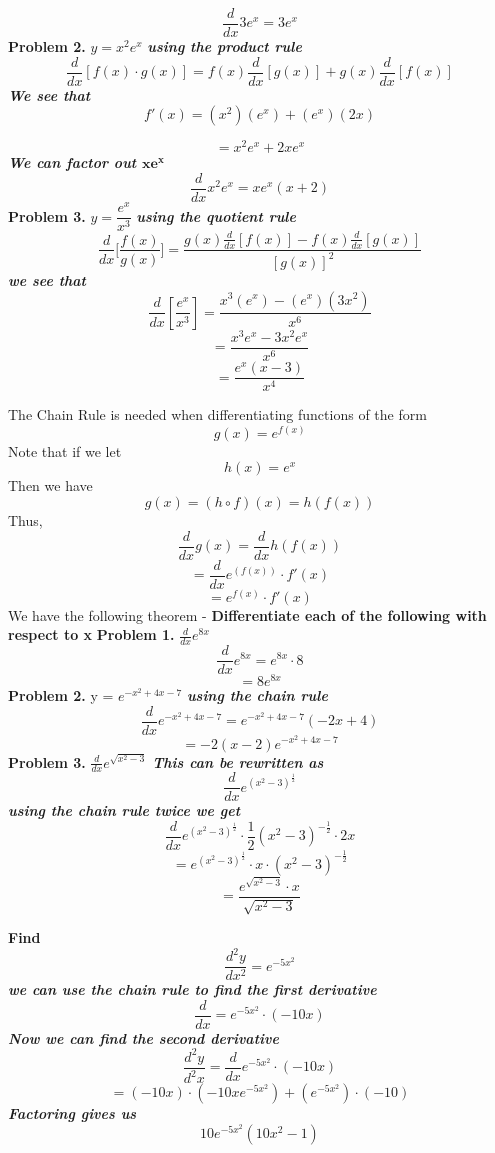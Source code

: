 \documentclass{report}
\begin{document}
  $$\frac{d}{dx}3e^x = 3e^x$$
  \bigbreak \noindent
  \textbf{Problem 2.} $y = x^2e^x$
  \bigbreak \noindent
  \textit{\textbf{using the product rule}}
  $$ \frac{d}{dx}[f(x) \cdot g(x)] = f(x) \frac{d}{dx}[g(x)] + g(x) \frac{d}{dx}[f(x)]$$
  \textit{\textbf{We see that}}
  $$f'(x) = (x^2)(e^x) + (e^x)(2x)$$
  
  $$ = x^2e^x + 2xe^x$$
  \textit{\textbf{We can factor out $\mathbf{xe^x}$}}
  $$ \frac{d}{dx}x^2e^x = xe^x(x + 2)$$
\bigbreak \noindent
\textbf{Problem 3.} $ y = \dfrac{e^x}{x^3}$
\bigbreak \noindent
\textit{\textbf{using the quotient rule}}
$$ \frac{d}{dx}\bigg[ \frac{f(x)}{g(x)}\bigg] = \frac{g(x) \frac{d}{dx}[f(x)] - f(x) \frac{d}{dx}[g(x)]}{[g(x)]^2}$$
\textit{\textbf{we see that}}
$$ \frac{d}{dx}\left[\dfrac{e^x}{x^3}\right] = \dfrac{x^3(e^x) - (e^x)(3x^2)}{x^6}$$
$$ = \dfrac{x^3e^x - 3x^2e^x}{x^6}$$
$$ = \dfrac{e^x(x-3)}{x^4}$$

\pagebreak
\noindent The Chain Rule is needed when differentiating functions of the form
$$g(x) = e^{f(x)}$$
\bigbreak \noindent
Note that if we let
$$h(x) = e^x$$
Then we have
$$ g(x)  = (h \circ f)(x) = h(f(x))$$
Thus,
$$ \frac{d}{dx}g(x) = \frac{d}{dx}h(f(x))$$
$$ = \frac{d}{dx}e^{(f(x))} \cdot f'(x)$$
$$ = e^{f(x)} \cdot f'(x)$$
\bigbreak \noindent
We have the following theorem
\bigbreak \noindent
{}
\bigbreak \noindent
\q
- \textbf{Differentiate each of the following with respect to x}
\bigbreak \noindent
\textbf{Problem 1.} $ \frac{d}{dx}e^{8x}$
\bigbreak \noindent
$$ \frac{d}{dx}e^{8x} = e^{8x} \cdot 8$$
$$ = 8e^{8x}$$
\bigbreak \noindent
\textbf{Problem 2.} y = $e^{-x^2 + 4x -7}$
\bigbreak \noindent
\textit{\textbf{using the chain rule}}
$$ \frac{d}{dx}e^{-x^2 + 4x -7} = e^{-x^2 + 4x -7}(-2x+4)$$
$$ = -2(x-2)e^{-x^2 + 4x -7}$$
\bigbreak \noindent
\textbf{Problem 3.} $ \frac{d}{dx}e^{\sqrt{x^2 -3}}$
\bigbreak \noindent
\textit{\textbf{This can be rewritten as}}
$$ \frac{d}{dx}e^{(x^2-3)^{\frac{1}{2}}}$$
\textit{\textbf{using the chain rule twice we get}}
$$ \frac{d}{dx}e^{(x^2 -3)^{\frac{1}{2}}} \cdot \dfrac{1}{2}(x^2 -3)^{-\frac{1}{2}} \cdot 2x$$
$$ = e^{(x^2-3)^{\frac{1}{2}}} \cdot x \cdot (x^2 -3)^{-\frac{1}{2}}$$
$$  = \dfrac{e^{\sqrt{x^2-3}} \cdot x}{\sqrt{x^2-3}}$$

\pagebreak
\q
\bigbreak \noindent
\textbf{Find} $$ \frac{d^2y}{dx^2} = e^{-5x^2}$$
\bigbreak \noindent
\sol
\bigbreak \noindent
\textit{\textbf{we can use the chain rule to find the first derivative}}
$$ \frac{d}{dx} = e^{-5x^2} \cdot (-10x)$$
\textit{\textbf{Now we can find the second derivative}}
$$ \frac{d^2y}{d^2x} = \frac{d}{dx}e^{-5x^2} \cdot (-10x)$$
$$ = (-10x) \cdot (-10xe^{-5x^2}) + (e^{-5x^2}) \cdot (-10)$$
\textit{\textbf{Factoring gives us}}
$$10e^{-5x^2}(10x^2-1)$$
\pagebreak
\end{document}
